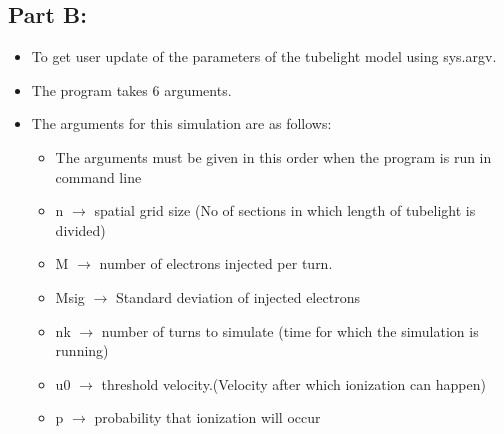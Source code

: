 \documentclass[10pt,a4paper]{article}
\providecommand{\tightlist}{%
      \setlength{\itemsep}{0pt}\setlength{\parskip}{0pt}}
\begin{document}
    \subsection{Part B:}\label{part-b}

\begin{itemize}
\tightlist
\item
  To get user update of the parameters of the tubelight model using
  sys.argv.
\item
  The program takes 6 arguments.
\item
  The arguments for this simulation are as follows:

  \begin{itemize}
  \tightlist
  \item
    The arguments must be given in this order when the program is run in
    command line
  \item
    n \(\to\) spatial grid size (No of sections in which length of
    tubelight is divided)
  \item
    M \(\to\) number of electrons injected per turn.
  \item
    Msig \(\to\) Standard deviation of injected electrons
  \item
    nk \(\to\) number of turns to simulate (time for which the
    simulation is running)
  \item
    u0 \(\to\) threshold velocity.(Velocity after which ionization can
    happen)
  \item
    p \(\to\) probability that ionization will occur
  \end{itemize}
\end{itemize}
\end{document}

